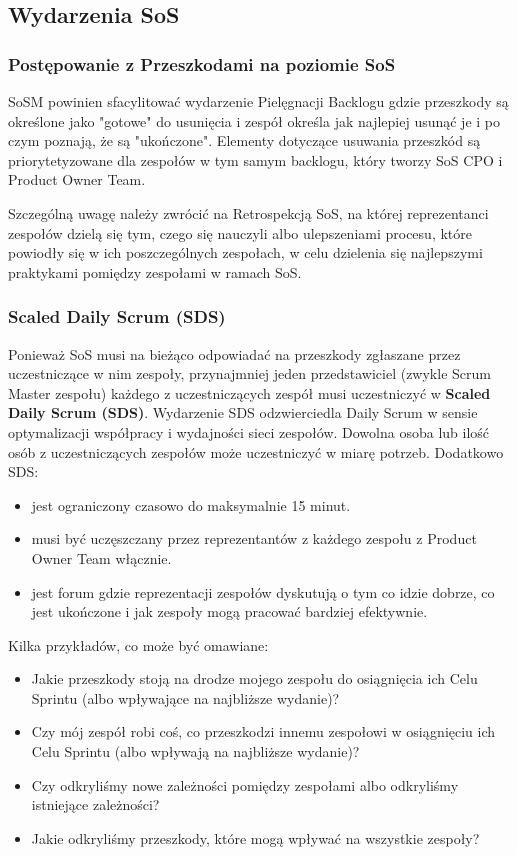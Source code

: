 \documentclass[12pt,a4paper,parskip=full]{scrartcl}
\begin{document}
\subsection{Wydarzenia SoS}

\subsubsection{Postępowanie z Przeszkodami na poziomie SoS}

SoSM powinien sfacylitować wydarzenie Pielęgnacji Backlogu gdzie przeszkody są określone jako "gotowe" do usunięcia i zespół określa jak najlepiej usunąć je i po czym poznają, że są "ukończone". Elementy dotyczące usuwania przeszkód są priorytetyzowane dla zespołów w tym samym backlogu, który tworzy SoS CPO i Product Owner Team.

Szczególną uwagę należy zwrócić na Retrospekcją SoS, na której reprezentanci zespołów dzielą się tym, czego się nauczyli albo ulepszeniami procesu, które powiodły się w ich poszczególnych zespołach, w celu dzielenia się najlepszymi praktykami pomiędzy zespołami w ramach SoS.  %

\subsubsection{Scaled Daily Scrum (SDS)}

Ponieważ SoS musi na bieżąco odpowiadać na przeszkody zgłaszane przez uczestniczące w nim zespoły, przynajmniej jeden przedstawiciel (zwykle Scrum Master zespołu) każdego z uczestniczących zespół musi uczestniczyć w \textbf{Scaled Daily Scrum (SDS)}. Wydarzenie SDS odzwierciedla Daily Scrum w sensie optymalizacji współpracy i wydajności sieci zespołów. Dowolna osoba lub ilość osób z uczestniczących zespołów może uczestniczyć w miarę potrzeb. Dodatkowo SDS:

\begin{itemize}
	\item jest ograniczony czasowo do maksymalnie 15 minut.
	\item musi być uczęszczany przez reprezentantów z każdego zespołu z Product Owner Team włącznie.
	\item jest forum gdzie reprezentacji zespołów dyskutują o tym co idzie dobrze, co jest ukończone i jak zespoły mogą pracować bardziej efektywnie. 
\end{itemize}
	
Kilka przykładów, co może być omawiane:
\begin{itemize}
	\item Jakie przeszkody stoją na drodze mojego zespołu do osiągnięcia ich Celu Sprintu (albo wpływające na najbliższe wydanie)?
	\item Czy mój zespół robi coś, co przeszkodzi innemu zespołowi w osiągnięciu ich Celu Sprintu (albo wpływają na najbliższe wydanie)?
	\item Czy odkryliśmy nowe zależności pomiędzy zespołami albo odkryliśmy istniejące zależności?
	\item Jakie odkryliśmy przeszkody, które mogą wpływać na wszystkie zespoły?
\end{itemize}
\end{document}
